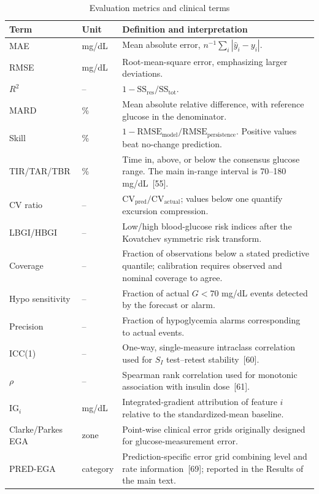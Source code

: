 \documentclass[10pt]{article}
\begin{document}
\begin{table}[h!]
\centering
\caption{Evaluation metrics and clinical terms}
\label{tab:metrics}
\footnotesize
\begin{tabular}{llp{12.3cm}}
\toprule
Term & Unit & Definition and interpretation \\
\midrule
MAE & mg/dL & Mean absolute error, $n^{-1}\sum_i |\hat{y}_i - y_i|$. \\
RMSE & mg/dL & Root-mean-square error, emphasizing larger deviations. \\
$R^2$ & -- & $1 - \text{SS}_{\text{res}}/\text{SS}_{\text{tot}}$. \\
MARD & \% & Mean absolute relative difference, with reference glucose in the denominator. \\
Skill & \% & $1 - \text{RMSE}_{\text{model}}/\text{RMSE}_{\text{persistence}}$. Positive values beat no-change prediction. \\
TIR/TAR/TBR & \% & Time in, above, or below the consensus glucose range. The main in-range interval is 70--180 mg/dL~[55]. \\
CV ratio & -- & $\text{CV}_{\text{pred}}/\text{CV}_{\text{actual}}$; values below one quantify excursion compression. \\
LBGI/HBGI & -- & Low/high blood-glucose risk indices after the Kovatchev symmetric risk transform. \\
Coverage & -- & Fraction of observations below a stated predictive quantile; calibration requires observed and nominal coverage to agree. \\
Hypo sensitivity & -- & Fraction of actual $G<70$ mg/dL events detected by the forecast or alarm. \\
Precision & -- & Fraction of hypoglycemia alarms corresponding to actual events. \\
ICC(1) & -- & One-way, single-measure intraclass correlation used for $S_I$ test--retest stability~[60]. \\
$\rho$ & -- & Spearman rank correlation used for monotonic association with insulin dose~[61]. \\
$\text{IG}_i$ & mg/dL & Integrated-gradient attribution of feature $i$ relative to the standardized-mean baseline. \\
Clarke/Parkes EGA & zone & Point-wise clinical error grids originally designed for glucose-measurement error. \\
PRED-EGA & category & Prediction-specific error grid combining level and rate information~[69]; reported in the Results of the main text. \\
\bottomrule
\end{tabular}
\end{table}
\end{document}
